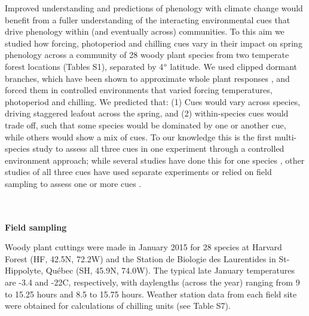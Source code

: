 \documentclass[11pt]{article}
\begin{document}
Improved understanding and predictions of phenology with climate change would benefit from a fuller understanding of the interacting environmental cues that drive phenology within (and eventually across) communities. To this aim we studied how forcing, photoperiod and chilling cues vary in their impact on spring phenology across a community of 28 woody plant species from two temperate forest locations (Tables S1), separated by 4$\degree$ latitude. We used clipped dormant branches, which have been shown to approximate whole plant responses \citep{vitasseclippings}, and forced them in controlled environments that varied forcing temperatures, photoperiod and chilling. We predicted that: (1) Cues would vary across species, driving staggered leafout across the spring, and (2) within-species cues would trade off, such that some species would be dominated by one or another cue, while others would show a mix of cues. To our knowledge this is the first multi-species study to assess all three cues in one experiment through a controlled environment approach; while several studies have done this for one species \citep{Worrall:1967aa,Skuterud:1994aa,Sogaard:2008aa,Sonsteby:2014aa}, other studies of all three cues have used separate experiments \citep[e.g.,][]{Caffarra:2011ab} or relied on field sampling to assess one or more cues \citep[e.g,][]{Basler:2012aa,laube2014gcb,zohner2016ncc}. 

\vspace{2ex}\\
\vspace{2ex}\\
\noindent \textbf{Field sampling}

\noindent Woody plant cuttings were made in January 2015 for 28 species at Harvard Forest (HF, 42.5\degree N, 72.2\degree W) and the Station de Biologie des Laurentides in St-Hippolyte, Qu\'ebec (SH, 45.9\degree N, 74.0\degree W). The typical late January temperatures are -3.4 and -22\degree C, respectively, with daylengths (across the year) ranging from 9 to 15.25 hours and 8.5 to 15.75 hours. Weather station data from each field site were obtained for calculations of chilling units (see Table S7). %
\end{document}
